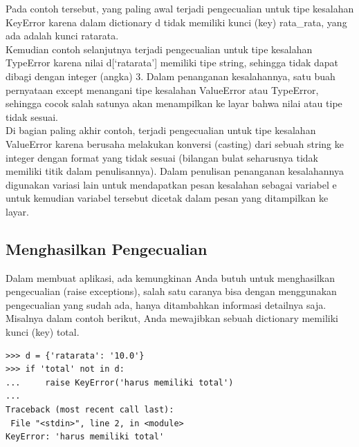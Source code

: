 Pada contoh tersebut, yang paling awal terjadi pengecualian untuk tipe kesalahan KeyError karena dalam dictionary d tidak memiliki kunci (key) rata\_rata, yang ada adalah kunci ratarata.\\

Kemudian contoh selanjutnya terjadi pengecualian untuk tipe kesalahan TypeError karena nilai d[‘ratarata’] memiliki tipe string, sehingga tidak dapat dibagi dengan integer (angka) 3. Dalam penanganan kesalahannya, satu buah pernyataan except menangani tipe kesalahan ValueError atau TypeError, sehingga cocok salah satunya akan menampilkan ke layar bahwa nilai atau tipe tidak sesuai.\\

Di bagian paling akhir contoh, terjadi pengecualian untuk tipe kesalahan ValueError karena berusaha melakukan konversi (casting) dari sebuah string ke integer dengan format yang tidak sesuai (bilangan bulat seharusnya tidak memiliki titik dalam penulisannya). Dalam penulisan penanganan kesalahannya digunakan variasi lain untuk mendapatkan pesan kesalahan sebagai variabel e untuk kemudian variabel tersebut dicetak dalam pesan yang ditampilkan ke layar.\\

\subsection{Menghasilkan Pengecualian} 
Dalam membuat aplikasi, ada kemungkinan Anda butuh untuk menghasilkan pengecualian (raise exceptions), salah satu caranya bisa dengan menggunakan pengecualian yang sudah ada, hanya ditambahkan informasi detailnya saja.\\

Misalnya dalam contoh berikut, Anda mewajibkan sebuah dictionary memiliki kunci (key) total.\\

\begin{verbatim}
>>> d = {'ratarata': '10.0'}
>>> if 'total' not in d:                                                                                                                         
...     raise KeyError('harus memiliki total')                                                                           
...                                                                                                                                              
Traceback (most recent call last):                                                                                                               
 File "<stdin>", line 2, in <module>                                                                                                            
KeyError: 'harus memiliki total'
\end{verbatim}

